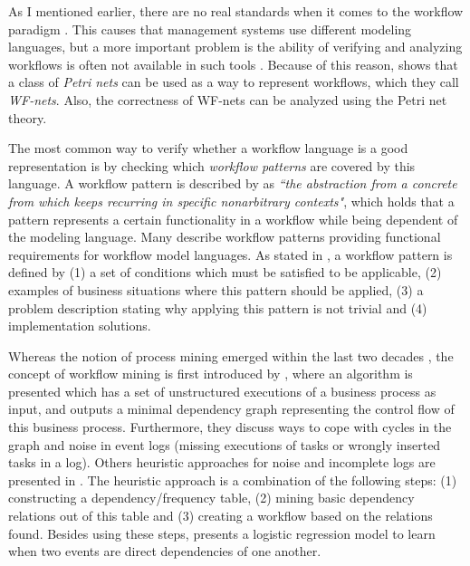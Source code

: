 \documentclass[a4paper,11pt]{article}
\begin{document}
As I mentioned earlier, there are no real standards when it comes to the workflow paradigm \cite{VanderAalst1997}. This causes that management systems use different modeling languages, but a more important problem is the ability of verifying and analyzing workflows is often not available in such tools \cite{VanderAalst1997}. Because of this reason, \cite{VanderAalst1997} shows that a class of \textit{Petri nets} can be used as a way to represent workflows, which they call \textit{WF-nets}. Also, the correctness of WF-nets can be analyzed using the Petri net theory. 


The most common way to verify whether a workflow language is a good representation is by checking which \textit{workflow patterns} are covered by this language. A workflow pattern is described by \cite{Riehle1996} as \textit{``the abstraction from a concrete from which keeps recurring in specific nonarbitrary contexts"}, which holds that a pattern represents a certain functionality in a workflow while being dependent of the modeling language. Many \cite{VanderAalst2003Patterns,Dijkstra2003ControlPatterns,Russell2004DataPatterns,Russell2005ResourcePatterns,Russell2006ExceptionPatterns} describe workflow patterns providing functional requirements for workflow model languages. As stated in \cite{VanderAalst2003Patterns,Dijkstra2003ControlPatterns,Russell2004DataPatterns,Russell2005ResourcePatterns,Russell2006ExceptionPatterns}, a workflow pattern is defined by (1) a set of conditions which must be satisfied to be applicable, (2) examples of business situations where this pattern should be applied, (3) a problem description stating why applying this pattern is not trivial and (4) implementation solutions.

Whereas the notion of process mining emerged within the last two decades \cite{VanderAalst2003}, the concept of workflow mining is first introduced by \cite{Agrawal1998}, where an algorithm is presented which has a set of unstructured executions of a business process as input, and outputs a minimal dependency graph representing the control flow of this business process. Furthermore, they discuss ways to cope with cycles in the graph and noise in event logs (missing executions of tasks or wrongly inserted tasks in a log). Others heuristic approaches for noise and incomplete logs are presented in \cite{Maruster2002,Weijters2001,Weijters}. The heuristic approach \cite{Weijters2001,Weijters} is a combination of the following steps: (1) constructing a dependency/frequency table, (2) mining basic dependency relations out of this table and (3) creating a workflow based on the relations found. Besides using these steps, \cite{Maruster2002} presents a logistic regression model to learn when two events are direct dependencies of one another. 
\end{document}
